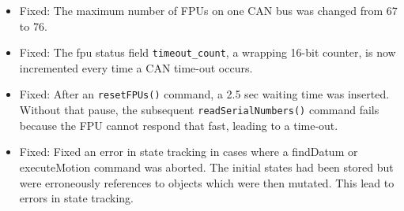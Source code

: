 \documentclass[11pt,a4paper]{scrartcl}
\begin{document}
\begin{itemize}
\item Fixed: The maximum number of FPUs on one CAN bus was changed
  from 67 to 76.
  
\item Fixed: The fpu status field \texttt{timeout\_count}, a wrapping
  16-bit counter, is now incremented every time a CAN time-out occurs.

\item Fixed: After an \texttt{resetFPUs()} command, a 2.5 sec waiting
  time was inserted. Without that pause, the subsequent
  \texttt{readSerialNumbers()} command fails because the FPU cannot
  respond that fast, leading to a time-out.

\item Fixed: Fixed an error in state tracking in cases where
  a findDatum or executeMotion command was aborted. The
  initial states had been stored but were erroneously
  references to objects which were then mutated. This lead
  to errors in state tracking.
  
\end{itemize}
 
\end{document}
